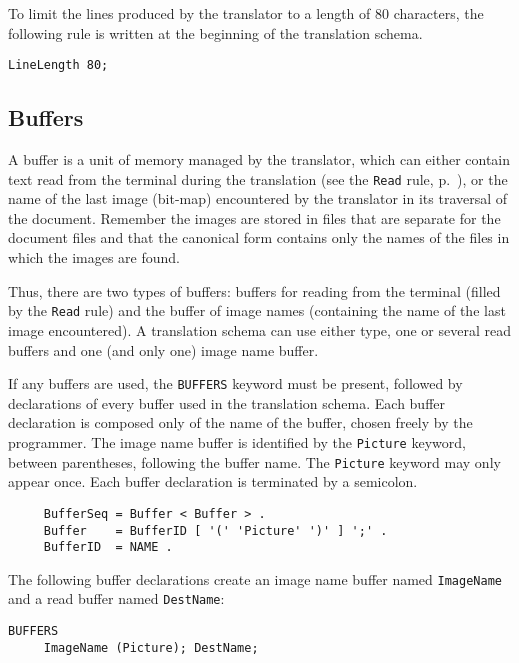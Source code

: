 \begin{example}
To limit the lines produced by the translator to a length of 80
characters, the following rule is written at the beginning of the
translation schema.
\begin{verbatim}
LineLength 80;
\end{verbatim}
\end{example}

\subsection{Buffers}

A buffer is a  unit of memory managed by the translator, which can
either contain text read from the terminal during the translation (see
the {\tt Read} rule, p.~\pageref{readrule}), or the name of the last image (bit-map)
encountered by the translator in its traversal of the document.
Remember the images are stored in files that are separate for the
document files and that the canonical form contains only the names of
the files in which the images are found.

Thus, there are two types of buffers:  buffers for reading from the
terminal (filled by the {\tt Read} rule) and the buffer of image
names (containing the name of the last image encountered).  A
translation schema can use either type, one or several read buffers
and one (and only one) image name buffer.

If any buffers are used, the {\tt BUFFERS} keyword must be present,
followed by declarations of every buffer used in the translation
schema.  Each buffer declaration  is composed only of the name of the
buffer, chosen freely by the programmer.  The image name buffer is
identified by the {\tt Picture} keyword, between parentheses,
following the buffer name.  The {\tt Picture} keyword may only appear
once.  Each buffer declaration is terminated by a semicolon.

\begin{verbatim}
     BufferSeq = Buffer < Buffer > .
     Buffer    = BufferID [ '(' 'Picture' ')' ] ';' .
     BufferID  = NAME .
\end{verbatim}

\begin{example}
The following buffer declarations create an image name buffer named
{\tt ImageName} and a read buffer named {\tt DestName}:
\begin{verbatim}
BUFFERS
     ImageName (Picture); DestName;
\end{verbatim}
\label{nomdest}
\end{example}

